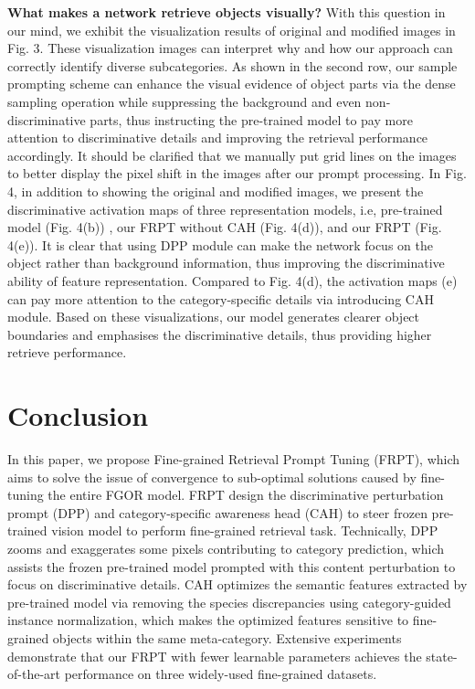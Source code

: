 \documentclass[letterpaper]{article} %
\begin{document}
\textbf{What makes a network retrieve objects visually?} With this question in our mind, we exhibit the visualization results of original and modified images in Fig. 3. These visualization images can interpret why and how our approach can correctly identify diverse subcategories. As shown in the second row, our sample prompting scheme can enhance the visual evidence of object parts via the dense sampling operation while suppressing the background and even non-discriminative parts, thus instructing the pre-trained model to pay more attention to discriminative details and improving the retrieval performance accordingly.
It should be clarified that we manually put grid lines on the images to better display the pixel shift in the images after our prompt processing. In Fig. 4, in addition to showing the original and modified images, we present the discriminative activation maps of three representation models, i.e, pre-trained model (Fig. 4(b)) , our FRPT without CAH (Fig. 4(d)), and our FRPT (Fig. 4(e)). It is clear that using DPP module can make the network focus on the object rather than background information, thus improving the discriminative ability of feature representation. Compared to Fig. 4(d), the activation maps (e) can pay more attention to the category-specific details via introducing CAH module. Based on these visualizations, our model generates clearer object boundaries and emphasises the discriminative details, thus providing higher retrieve performance.





\vspace{-0.89mm}
\vspace{-1.51mm}
\section{Conclusion}
In this paper, we propose Fine-grained Retrieval Prompt Tuning (FRPT), which aims to solve the issue of convergence to sub-optimal solutions caused by fine-tuning the entire FGOR model. FRPT design the discriminative perturbation prompt (DPP) and category-specific awareness head (CAH) to steer frozen pre-trained vision model to perform fine-grained retrieval task.
Technically, DPP zooms and exaggerates some pixels contributing to category prediction, which assists the frozen pre-trained model prompted with this content perturbation to focus on discriminative details.
CAH optimizes the semantic features extracted by pre-trained model via removing the species discrepancies using category-guided instance normalization,  which makes the optimized features sensitive to fine-grained objects within the same meta-category.
Extensive experiments demonstrate that our FRPT with fewer learnable parameters achieves the state-of-the-art performance on three widely-used fine-grained datasets.
\vspace{-1.62mm}
\end{document}
